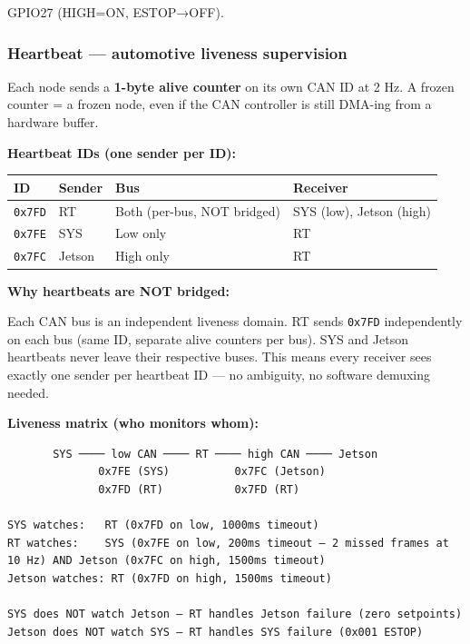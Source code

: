 \documentclass[12pt,a4paper,oneside]{report}
\begin{document}
GPIO27 (HIGH=ON, ESTOP→OFF).

\subsubsection{Heartbeat --- automotive liveness
supervision}\label{heartbeat-automotive-liveness-supervision}

Each node sends a \textbf{1-byte alive counter} on its own CAN ID at 2 Hz. A
frozen counter = a frozen node, even if the CAN controller is still DMA-ing from
a hardware buffer.

\textbf{Heartbeat IDs (one sender per ID):}

\begin{longtable}[]{@{}llll@{}}
\toprule\noalign{}
ID & Sender & Bus & Receiver \\
\midrule\noalign{}
\endhead
\bottomrule\noalign{}
\endlastfoot
\texttt{0x7FD} & RT & Both (per-bus, NOT bridged) & SYS (low), Jetson (high) \\
\texttt{0x7FE} & SYS & Low only & RT \\
\texttt{0x7FC} & Jetson & High only & RT \\
\end{longtable}

\textbf{Why heartbeats are NOT bridged:}

Each CAN bus is an independent liveness domain. RT sends \texttt{0x7FD}
independently on each bus (same ID, separate alive counters per bus). SYS and
Jetson heartbeats never leave their respective buses. This means every receiver
sees exactly one sender per heartbeat ID --- no ambiguity, no software demuxing
needed.

\textbf{Liveness matrix (who monitors whom):}

\begin{verbatim}
       SYS ──── low CAN ──── RT ──── high CAN ──── Jetson
              0x7FE (SYS)          0x7FC (Jetson)
              0x7FD (RT)           0x7FD (RT)

SYS watches:   RT (0x7FD on low, 1000ms timeout)
RT watches:    SYS (0x7FE on low, 200ms timeout — 2 missed frames at 10 Hz) AND Jetson (0x7FC on high, 1500ms timeout)
Jetson watches: RT (0x7FD on high, 1500ms timeout)

SYS does NOT watch Jetson — RT handles Jetson failure (zero setpoints)
Jetson does NOT watch SYS — RT handles SYS failure (0x001 ESTOP)
\end{verbatim}
\end{document}
